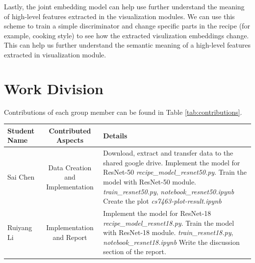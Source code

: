 \documentclass[10pt,twocolumn,letterpaper]{article}
\begin{document}
Lastly, the joint embedding model can help use further understand the meaning of high-level features extracted in the visualization modules. We can use this scheme to train a simple discriminator and change specific parts in the recipe (for example, cooking style) to see how the extracted visulization embeddings change. This can help us further understand the semantic meaning of a high-level features extracted in visualization module.

\section{Work Division}

Contributions of each group member can be found in Table \ref{tab:contributions}.

\begin{table}
\begin{center}
\begin{tabular}{|l|c|p{8cm}|}
\hline
Student Name & Contributed Aspects & Details \\
\hline\hline

Sai Chen & Data Creation and Implementation & 
Download, extract and transfer data to the shared google drive. \newline\newline
Implement the model for ResNet-50 \newline
\emph{recipe\_model\_resnet50.py}. \newline\newline
Train the model with ResNet-50 module. \newline
\emph{train\_resnet50.py}, \emph{notebook\_resnet50.ipynb} \newline\newline
Create the plot\newline
\emph{cs7463-plot-result.ipynb} \newline \\
\hline

Ruiyang Li & Implementation and Report & 
Implement the model for ResNet-18 \newline
\emph{recipe\_model\_resnet18.py}. \newline\newline
Train the model with ResNet-18 module. \newline
\emph{train\_resnet18.py}, \emph{notebook\_resnet18.ipynb} \newline\newline
Write the discussion section of the report. \newline \\
\hline


\end{tabular}
\end{center}
\end{table}
\end{document}
